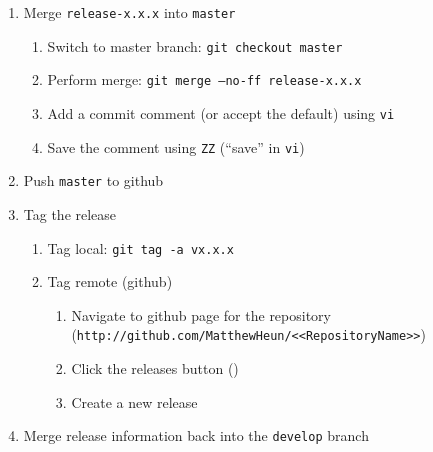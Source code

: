 \documentclass{article}
\begin{document}
\begin{enumerate}

  \item Merge \texttt{release-x.x.x} into \texttt{master}
  \begin{enumerate}

    \item Switch to master branch: \texttt{git checkout master} 

    \item Perform merge: \texttt{git merge --no-ff release-x.x.x}
	
	\item Add a commit comment (or accept the default) using \texttt{vi} 
	
	\item Save the comment using \texttt{ZZ} (``save'' in \texttt{vi})
	
  \end{enumerate}
  \item Push \texttt{master} to github
  
  \item Tag the release
  \begin{enumerate}

    \item Tag local: \texttt{git tag -a vx.x.x}

    \item Tag remote (github)
	\begin{enumerate}

	  \item Navigate to github page for the repository\\
	  		(\texttt{http://github.com/MatthewHeun/<<RepositoryName>>})

	  \item Click the releases button ()
	  
	  \item Create a new release

	\end{enumerate}

  \end{enumerate}
  \item Merge release information back into the \texttt{develop} branch
  \begin{enumerate}


\end{enumerate}
\end{enumerate}
\end{document}
